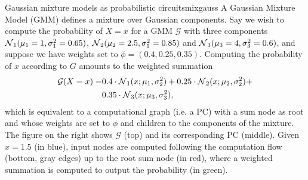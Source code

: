 \newcommand\mone{1}%
\newcommand\sone{0.65}%
\newcommand\mtwo{2.5}%
\newcommand\stwo{0.85}%
\newcommand\mthr{4}%
\newcommand\sthr{0.6}%
\begin{example}[sidebyside,lefthand width=0.55\textwidth]{Gaussian mixture models as probabilistic circuits}{mixgauss}
  A Gaussian Mixture Model (GMM) defines a mixture over Gaussian components. Say we wish to compute
  the probability of $X=x$ for a GMM $\mathcal{G}$ with three components
  $\gaussian_1(\mu_1=\mone,\sigma^2_1=\sone)$, $\gaussian_2(\mu_2=\mtwo, \sigma^2_1=\stwo)$ and
  $\gaussian_3(\mu_3=\mthr,\sigma^2_3=\sthr)$, and suppose we have weights set to
  $\phi=(0.4,0.25,0.35)$. Computing the probability of $x$ according to $G$ amounts to the weighted
  summation
  \begin{align*}
    \mathcal{G}(X=x)=&0.4\cdot\operatorname{\mathcal{N}}_1(x;\mu_1,\sigma^2_2)+0.25\cdot\operatorname{\mathcal{N}}_2(x;\mu_2,\sigma^2_2)+\\
                     &0.35\cdot\operatorname{\mathcal{N}}_3(x;\mu_3,\sigma^2_3),
  \end{align*}
  which is equivalent to a computational graph (i.e. a PC) with a sum node as root and whose
  weights are set to $\phi$ and children to the components of the mixture. The figure on the right
  shows $\mathcal{G}$ (top) and its corresponding PC (middle). Given $x=1.5$ (in blue), input nodes
  are computed following the computation flow (bottom, gray edges) up to the root sum node (in
  red), where a weighted summation is computed to output the probability (in green).


\end{example}
